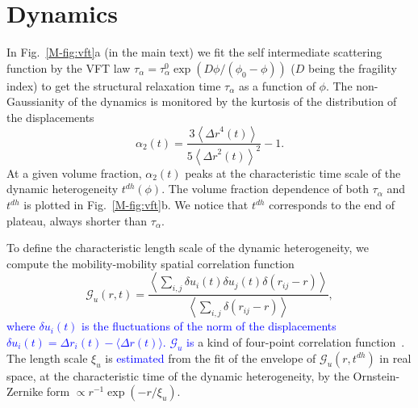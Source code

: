 \documentclass[prl,twocolumn,notitlepage]{revtex4-1}
\begin{document}
\section*{Dynamics}

In Fig.~\ref{M-fig:vft}a (in the main text) we fit the self intermediate scattering function by the VFT law $\tau_\alpha=\tau_\alpha^0 \exp(D\phi/(\phi_0-\phi))$ ($D$ being the fragility index) to get the structural relaxation time $\tau_\alpha$ as a function of $\phi$. The non-Gaussianity of the dynamics is monitored by the kurtosis of the distribution of the displacements 
\begin{equation}
	\alpha_2(t) = \frac{3 \left\langle {\Delta r}^4(t) \right\rangle}{5 {\left\langle {\Delta r}^2(t) \right\rangle}^2}-1. 
	\label{eq:ng}
\end{equation}
At a given volume fraction, $\alpha_2(t)$ peaks at the characteristic time scale of the dynamic heterogeneity $t^{dh}(\phi)$. The volume fraction dependence of both $\tau_\alpha$ and $t^{dh}$ is plotted in Fig.~\ref{M-fig:vft}b. We notice that $t^{dh}$ corresponds to the end of plateau, always shorter than $\tau_\alpha$.

To define the characteristic length scale of the dynamic heterogeneity, we compute the mobility-mobility spatial correlation function~\cite{Donati1999}
\begin{equation}
	\mathcal{G}_u(r,t) = \frac{
		\left\langle \sum_{i,j}{\delta u_i(t) \delta u_j(t) \delta(r_{ij} -r)} \right\rangle 
	}{
		\left\langle \sum_{i,j}{\delta(r_{ij} -r)} \right\rangle
	},
	\label{eq:mobility_correl}
\end{equation}
\textcolor{blue}{where $\delta u_i(t)$ is the fluctuations of the norm of the displacements $\delta u_i(t) = \Delta r_i(t)-\langle\Delta r(t)\rangle$. $\mathcal{G}_u$ is} a kind of four-point correlation function~\cite{cavagna2009supercooled}. The length scale $\xi_u$ is \textcolor{blue}{estimated} from the fit of the envelope of $\mathcal{G}_u(r,t^{dh})$ in real space, at the characteristic time of the dynamic heterogeneity, by the Ornstein-Zernike form $\propto r^{-1}\exp( -r/\xi_u)$.



%

\end{document}
